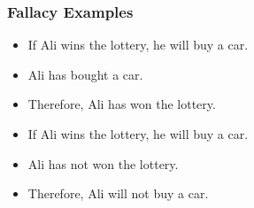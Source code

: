 \documentclass[dvipsnames]{beamer}
\begin{document}
\begin{frame}
  \frametitle{Fallacy Examples}

  \begin{example}
    \begin{itemize}
      \item If Ali wins the lottery, he will buy a car.
      \item Ali has bought a car.

      \medskip
      \item Therefore, Ali has won the lottery.
    \end{itemize}
  \end{example}

  \pause
  \begin{example}
    \begin{itemize}
      \item If Ali wins the lottery, he will buy a car.
      \item Ali has not won the lottery.

      \medskip
      \item Therefore, Ali will not buy a car.
    \end{itemize}
  \end{example}
\end{frame}
\end{document}
